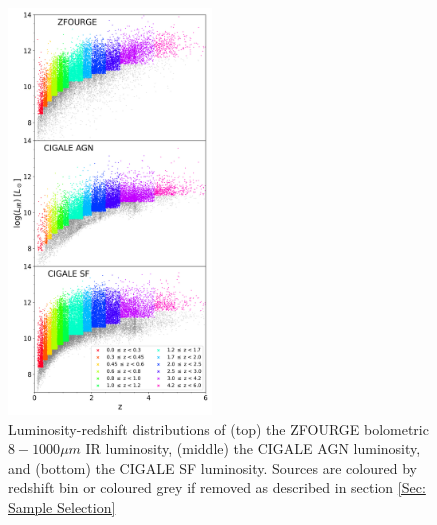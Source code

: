 \begin{figure}
    \centering
    \includegraphics[width=0.48\textwidth]{Figures/LIR_vs_Z.png}
    \caption{Luminosity-redshift distributions of (top) the ZFOURGE bolometric $8-1000\mu m$ IR luminosity, (middle) the CIGALE AGN luminosity, and (bottom) the CIGALE SF luminosity. Sources are coloured by redshift bin or coloured grey if removed as described in section \ref{Sec: Sample Selection}}
    \label{Fig: ZF Lum vs z}
\end{figure}



